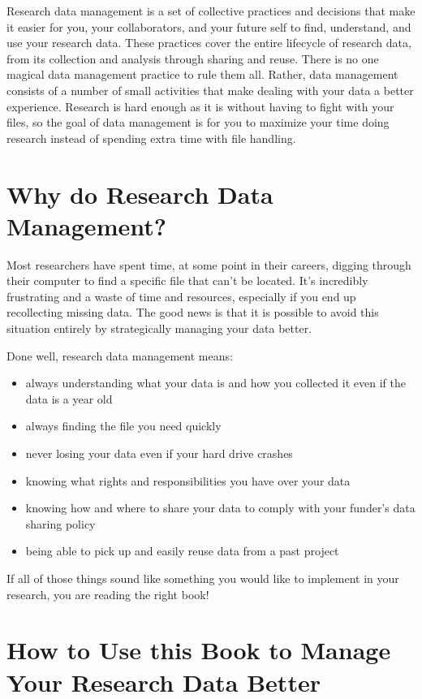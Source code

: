 \documentclass[
]{book}
\providecommand{\tightlist}{%
  \setlength{\itemsep}{0pt}\setlength{\parskip}{0pt}}
\begin{document}
Research data management is a set of collective practices and decisions that make it easier for you, your collaborators, and your future self to find, understand, and use your research data. These practices cover the entire lifecycle of research data, from its collection and analysis through sharing and reuse. There is no one magical data management practice to rule them all. Rather, data management consists of a number of small activities that make dealing with your data a better experience. Research is hard enough as it is without having to fight with your files, so the goal of data management is for you to maximize your time doing research instead of spending extra time with file handling.

\hypertarget{why-rdm}{%
\section{Why do Research Data Management?}\label{why-rdm}}

Most researchers have spent time, at some point in their careers, digging through their computer to find a specific file that can't be located. It's incredibly frustrating and a waste of time and resources, especially if you end up recollecting missing data. The good news is that it is possible to avoid this situation entirely by strategically managing your data better.

Done well, research data management means:

\begin{itemize}
\tightlist
\item
  always understanding what your data is and how you collected it even if the data is a year old
\item
  always finding the file you need quickly
\item
  never losing your data even if your hard drive crashes
\item
  knowing what rights and responsibilities you have over your data
\item
  knowing how and where to share your data to comply with your funder's data sharing policy
\item
  being able to pick up and easily reuse data from a past project
\end{itemize}

If all of those things sound like something you would like to implement in your research, you are reading the right book!

\hypertarget{how-rdm}{%
\section{How to Use this Book to Manage Your Research Data Better}\label{how-rdm}}
\end{document}
